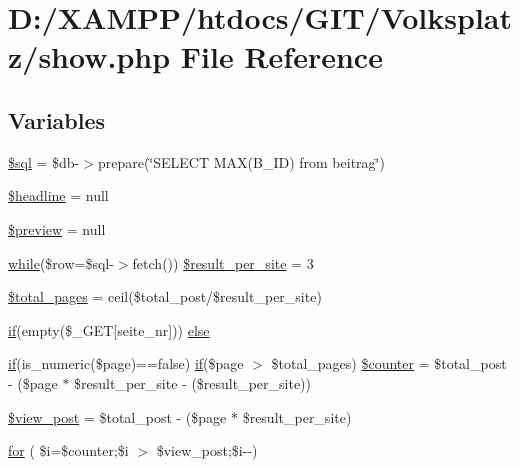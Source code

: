 \hypertarget{show_8php}{}\section{D\+:/\+X\+A\+M\+P\+P/htdocs/\+G\+I\+T/\+Volksplatz/show.php File Reference}
\label{show_8php}
\subsection*{Variables}
\begin{DoxyCompactItemize}
\item 
\mbox{\hyperlink{show_8php_a047170d6020a882807665812a27e2525}{\$sql}} = \$db-\/$>$prepare(\char`\"{}S\+E\+L\+E\+CT M\+AX(B\+\_\+\+ID) from beitrag\char`\"{})
\item 
\mbox{\hyperlink{show_8php_a719624ae2e05a123335f853fbbeefe29}{\$headline}} = null
\item 
\mbox{\hyperlink{show_8php_a0337b146b90f6335d6c314969231b310}{\$preview}} = null
\item 
\mbox{\hyperlink{showpost_8php_a0074fdcf62116989383290ee4de5f453}{while}}(\$row=\$sql-\/$>$fetch()) \mbox{\hyperlink{show_8php_a7ef85f3a1ee9aa9e2840b2d071fd15b5}{\$result\+\_\+per\+\_\+site}} = 3
\item 
\mbox{\hyperlink{show_8php_a75dd972125f47d333492e70523d1aa6a}{\$total\+\_\+pages}} = ceil(\$total\+\_\+post/\$result\+\_\+per\+\_\+site)
\item 
\mbox{\hyperlink{view__all_8php_ac0971e25a4f61580752c758ef520f6b2}{if}}(empty(\$\+\_\+\+G\+ET\mbox{[}\textquotesingle{}seite\+\_\+nr\textquotesingle{}\mbox{]})) \mbox{\hyperlink{show_8php_a15763ab84c36ab79512146d33738c5f5}{else}}
\item 
\mbox{\hyperlink{view__all_8php_ac0971e25a4f61580752c758ef520f6b2}{if}}(is\+\_\+numeric(\$page)==false) \mbox{\hyperlink{view__all_8php_ac0971e25a4f61580752c758ef520f6b2}{if}}(\$page $>$ \$total\+\_\+pages) \mbox{\hyperlink{show_8php_a9380be99504e80c93a61c79bf95ca7c5}{\$counter}} = \$total\+\_\+post -\/ (\$page $\ast$ \$result\+\_\+per\+\_\+site -\/ (\$result\+\_\+per\+\_\+site))
\item 
\mbox{\hyperlink{show_8php_a5b99fdb1a492e115a7192ca90bc4c455}{\$view\+\_\+post}} = \$total\+\_\+post -\/ (\$page $\ast$ \$result\+\_\+per\+\_\+site)
\item 
\mbox{\hyperlink{show_8php_a80c68fef22aea95c13a63061dcbb9e25}{for}} ( \$i=\$counter;\$i $>$ \$view\+\_\+post;\$i-\/-\/)
\end{DoxyCompactItemize}


